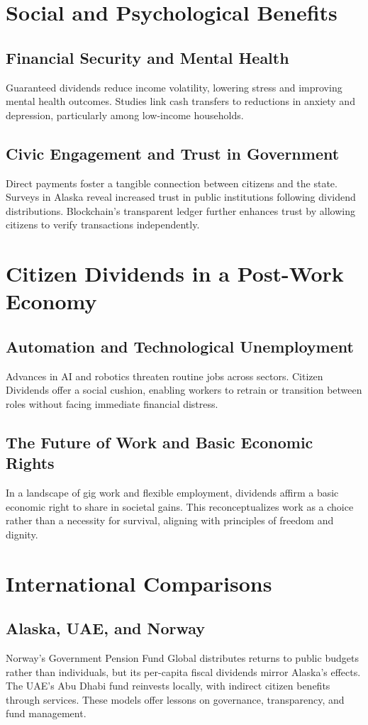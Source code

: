 \documentclass[11pt]{article}
\begin{document}
\section{Social and Psychological Benefits}
\subsection{Financial Security and Mental Health}
Guaranteed dividends reduce income volatility, lowering stress and improving mental health outcomes. Studies link cash transfers to reductions in anxiety and depression, particularly among low-income households.

\subsection{Civic Engagement and Trust in Government}
Direct payments foster a tangible connection between citizens and the state. Surveys in Alaska reveal increased trust in public institutions following dividend distributions. Blockchain’s transparent ledger further enhances trust by allowing citizens to verify transactions independently.

\section{Citizen Dividends in a Post-Work Economy}
\subsection{Automation and Technological Unemployment}
Advances in AI and robotics threaten routine jobs across sectors. Citizen Dividends offer a social cushion, enabling workers to retrain or transition between roles without facing immediate financial distress.

\subsection{The Future of Work and Basic Economic Rights}
In a landscape of gig work and flexible employment, dividends affirm a basic economic right to share in societal gains. This reconceptualizes work as a choice rather than a necessity for survival, aligning with principles of freedom and dignity.

\section{International Comparisons}
\subsection{Alaska, UAE, and Norway}
Norway’s Government Pension Fund Global distributes returns to public budgets rather than individuals, but its per-capita fiscal dividends mirror Alaska’s effects. The UAE’s Abu Dhabi fund reinvests locally, with indirect citizen benefits through services. These models offer lessons on governance, transparency, and fund management.
\end{document}
